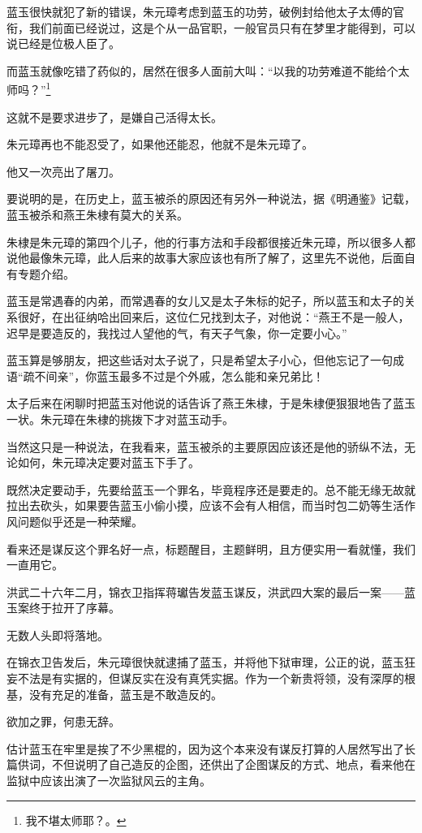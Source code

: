 \begin{multicols}{\theparacolNo}
		蓝玉很快就犯了新的错误，朱元璋考虑到蓝玉的功劳，破例封给他太子太傅的官衔，我们前面已经说过，这是个从一品官职，一般官员只有在梦里才能得到，可以说已经是位极人臣了。

		而蓝玉就像吃错了药似的，居然在很多人面前大叫：“以我的功劳难道不能给个太师吗？”\footnote{我不堪太师耶？。}

		这就不是要求进步了，是嫌自己活得太长。

		朱元璋再也不能忍受了，如果他还能忍，他就不是朱元璋了。

		他又一次亮出了屠刀。

		要说明的是，在历史上，蓝玉被杀的原因还有另外一种说法，据《明通鉴》记载，蓝玉被杀和燕王朱棣有莫大的关系。

		朱棣是朱元璋的第四个儿子，他的行事方法和手段都很接近朱元璋，所以很多人都说他最像朱元璋，此人后来的故事大家应该也有所了解了，这里先不说他，后面自有专题介绍。

		蓝玉是常遇春的内弟，而常遇春的女儿又是太子朱标的妃子，所以蓝玉和太子的关系很好，在出征纳哈出回来后，这位仁兄找到太子，对他说：“燕王不是一般人，迟早是要造反的，我找过人望他的气，有天子气象，你一定要小心。”

		蓝玉算是够朋友，把这些话对太子说了，只是希望太子小心，但他忘记了一句成语“疏不间亲”，你蓝玉最多不过是个外戚，怎么能和亲兄弟比！

		太子后来在闲聊时把蓝玉对他说的话告诉了燕王朱棣，于是朱棣便狠狠地告了蓝玉一状。朱元璋在朱棣的挑拨下才对蓝玉动手。

		当然这只是一种说法，在我看来，蓝玉被杀的主要原因应该还是他的骄纵不法，无论如何，朱元璋决定要对蓝玉下手了。

		既然决定要动手，先要给蓝玉一个罪名，毕竟程序还是要走的。总不能无缘无故就拉出去砍头，如果要告蓝玉小偷小摸，应该不会有人相信，而当时包二奶等生活作风问题似乎还是一种荣耀。

		看来还是谋反这个罪名好一点，标题醒目，主题鲜明，且方便实用一看就懂，我们一直用它。

		洪武二十六年二月，锦衣卫指挥蒋瓛告发蓝玉谋反，洪武四大案的最后一案——蓝玉案终于拉开了序幕。

		无数人头即将落地。

		在锦衣卫告发后，朱元璋很快就逮捕了蓝玉，并将他下狱审理，公正的说，蓝玉狂妄不法是有实据的，但谋反实在没有真凭实据。作为一个新贵将领，没有深厚的根基，没有充足的准备，蓝玉是不敢造反的。

		欲加之罪，何患无辞。

		估计蓝玉在牢里是挨了不少黑棍的，因为这个本来没有谋反打算的人居然写出了长篇供词，不但说明了自己造反的企图，还供出了企图谋反的方式、地点，看来他在监狱中应该出演了一次监狱风云的主角。


\end{multicols}
